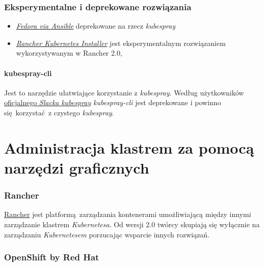 \documentclass[a4paper,12pt,twoside,openany]{report}
\providecommand{\tightlist}{%
  \setlength{\itemsep}{0pt}\setlength{\parskip}{0pt}}
\begin{document}
\hypertarget{eksperymentalne-i-deprekowane-rozwiux105zania}{%
\subsubsection{Eksperymentalne i deprekowane
rozwiązania}\label{eksperymentalne-i-deprekowane-rozwiux105zania}}

\begin{itemize}
\tightlist
\item
  \href{https://kubernetes.io/docs/getting-started-guides/fedora/fedora_ansible_config/}{\emph{Fedora
  via Ansible}} deprekowane na rzecz \emph{kubespray}
\item
  \href{http://rancher.com/announcing-rke-lightweight-kubernetes-installer/}{\emph{Rancher
  Kubernetes Installer}} jest eksperymentalnym rozwiązaniem
  wykorzystywanym w Rancher 2.0,
\end{itemize}

\hypertarget{kubespray-cli}{%
\paragraph{kubespray-cli}\label{kubespray-cli}}

Jest to narzędzie ułatwiające korzystanie z \emph{kubespray}. Według
użytkowników
\href{https://kubernetes.slack.com/messages/kubespray}{oficjalnego
\emph{Slacka} \emph{kubespray}} \emph{kubespray-cli} jest deprekowane i
powinno się~korzystać~z czystego \emph{kubespray}.

\hypertarget{administracja-klastrem-za-pomocux105-narzux119dzi-graficznych}{%
\section{Administracja klastrem za pomocą narzędzi
graficznych}\label{administracja-klastrem-za-pomocux105-narzux119dzi-graficznych}}

\hypertarget{rancher}{%
\subsubsection{Rancher}\label{rancher}}

\href{https://rancher.com/}{Rancher} jest platformą~zarządzania
kontenerami umożliwiającą między innymi zarządzanie klastrem
\emph{Kubernetesa}. Od wersji 2.0 twórcy skupiają się wyłącznie na
zarządzaniu \emph{Kubernetesem} porzucając wsparcie innych rozwiązań.

\hypertarget{openshift-origin}{%
\subsubsection{OpenShift by Red Hat}\label{openshift-origin}}
\end{document}
